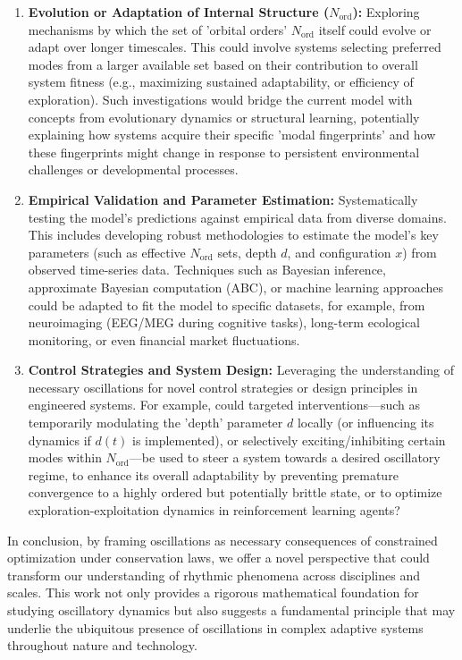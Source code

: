 \documentclass[11pt,a4paper]{article}
\begin{document}
\begin{enumerate}
    \item \textbf{Evolution or Adaptation of Internal Structure ($N_{\text{ord}}$):} Exploring mechanisms by which the set of 'orbital orders' $N_{\text{ord}}$ itself could evolve or adapt over longer timescales. This could involve systems selecting preferred modes from a larger available set based on their contribution to overall system fitness (e.g., maximizing sustained adaptability, or efficiency of exploration). Such investigations would bridge the current model with concepts from evolutionary dynamics or structural learning, potentially explaining how systems acquire their specific 'modal fingerprints' and how these fingerprints might change in response to persistent environmental challenges or developmental processes.

    \item \textbf{Empirical Validation and Parameter Estimation:} Systematically testing the model's predictions against empirical data from diverse domains. This includes developing robust methodologies to estimate the model's key parameters (such as effective $N_{\text{ord}}$ sets, depth $d$, and configuration $x$) from observed time-series data. Techniques such as Bayesian inference, approximate Bayesian computation (ABC), or machine learning approaches could be adapted to fit the model to specific datasets, for example, from neuroimaging (EEG/MEG during cognitive tasks), long-term ecological monitoring, or even financial market fluctuations.

    \item \textbf{Control Strategies and System Design:} Leveraging the understanding of necessary oscillations for novel control strategies or design principles in engineered systems. For example, could targeted interventions—such as temporarily modulating the 'depth' parameter $d$ locally (or influencing its dynamics if $d(t)$ is implemented), or selectively exciting/inhibiting certain modes within $N_{\text{ord}}$—be used to steer a system towards a desired oscillatory regime, to enhance its overall adaptability by preventing premature convergence to a highly ordered but potentially brittle state, or to optimize exploration-exploitation dynamics in reinforcement learning agents?
\end{enumerate}

In conclusion, by framing oscillations as necessary consequences of constrained optimization under conservation laws, we offer a novel perspective that could transform our understanding of rhythmic phenomena across disciplines and scales. This work not only provides a rigorous mathematical foundation for studying oscillatory dynamics but also suggests a fundamental principle that may underlie the ubiquitous presence of oscillations in complex adaptive systems throughout nature and technology.
\end{document}
